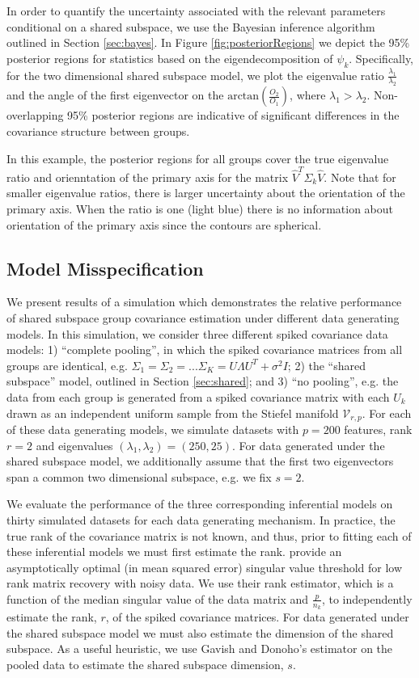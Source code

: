\documentclass{article}
\begin{document}
In order to quantify the uncertainty associated with the relevant
parameters conditional on a shared subspace, we use the Bayesian
inference algorithm outlined in Section \ref{sec:bayes}. In Figure
\ref{fig:posteriorRegions} we depict the 95\% posterior regions for
statistics based on the eigendecomposition of
$\psi_k$.  Specifically, for the two dimensional
shared subspace model, we plot the eigenvalue ratio
$\frac{\lambda_1}{\lambda_2}$ and the angle of the first eigenvector
on the $\text{arctan}(\frac{O_2}{O_1})$, where
$\lambda_1 > \lambda_2$.  Non-overlapping 95\% posterior regions are
indicative of significant differences in the covariance structure
between groups.

In this example, the posterior regions for all groups cover the true
eigenvalue ratio and orienntation of the primary axis for the matrix
$\hat{V}^T\Sigma_k\hat{V}$.  Note that for smaller eigenvalue ratios,
there is larger uncertainty about the orientation of the primary axis.
When the ratio is one (light blue) there is no information about
orientation of the primary axis since the contours are spherical.

\subsection{Model Misspecification}

We present results of a simulation which demonstrates the
relative performance of shared subspace group covariance estimation
under different data generating models.  In this simulation, we consider three different
spiked covariance data models: 1) ``complete pooling'', in which the
spiked covariance matrices from all groups are identical, e.g.
$\Sigma_1 = \Sigma_2 = ... \Sigma_K = U\Lambda U^T + \sigma^2I$; 2)
the ``shared subspace'' model, outlined in Section \ref{sec:shared};
and 3) ``no pooling'', e.g. the data from each group is generated from
a spiked covariance matrix with each $U_k$ drawn as an independent
uniform sample from the Stiefel manifold $\mathcal{V}_{r, p}$.  For
each of these data generating models, we simulate datasets
with $p=200$ features, rank $r=2$ and eigenvalues
$(\lambda_1, \lambda_2) = (250, 25)$.  For data generated under the
shared subspace model, we additionally assume that the first two
eigenvectors span a common two dimensional subspace, e.g. we fix
$s=2$. 

We evaluate the performance of the three corresponding inferential
models on thirty simulated datasets for each data generating
mechanism.  In practice, the true rank of the covariance matrix is not
known, and thus, prior to fitting each of these inferential models we
must first estimate the rank.  \citet{Gavish2014} provide an
asymptotically optimal (in mean squared error) singular value
threshold for low rank matrix recovery with noisy data.  We use their
rank estimator, which is a function of the median singular value of
the data matrix and $\frac{p}{n_k}$, to independently estimate the
rank, $r$, of the spiked covariance matrices.  For data generated
under the shared subspace model we must also estimate the dimension of
the shared subspace.  As a useful heuristic, we use Gavish and
Donoho's estimator on the pooled data to estimate the shared subspace
dimension, $s$.
\end{document}
